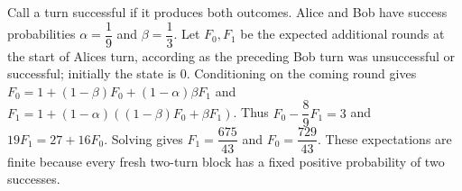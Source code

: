 Call a turn successful if it produces both outcomes. Alice and Bob have success probabilities $\alpha=\dfrac{1}{9}$ and $\beta=\dfrac{1}{3}$. Let $F_0,F_1$ be the expected additional rounds at the start of Alice\textquotesingle s turn, according as the preceding Bob turn was unsuccessful or successful; initially the state is $0$. Conditioning on the coming round gives $F_0=1+(1-\beta)F_0+(1-\alpha)\beta F_1$ and $F_1=1+(1-\alpha)((1-\beta)F_0+\beta F_1)$. Thus $F_0-\dfrac{8}{9}F_1=3$ and $19F_1=27+16F_0$. Solving gives $F_1=\dfrac{675}{43}$ and $\boxed{F_0=\dfrac{729}{43}}$. These expectations are finite because every fresh two-turn block has a fixed positive probability of two successes.
